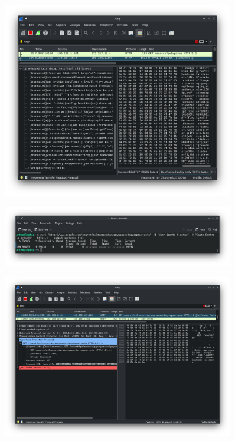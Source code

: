 \documentclass[12pt]{extarticle}
\begin{document}
\begin{figure}[H]
    \centering
    \includegraphics[width=0.90\textwidth]{shark_expires}
    \caption{}
\end{figure}
\begin{figure}[H]
    \centering
    \includegraphics[width=0.90\textwidth]{private}
    \caption{}
\end{figure}
\begin{figure}[H]
    \centering
    \includegraphics[width=0.90\textwidth]{shark_no_cashe}
    \caption{}
\end{figure}
\end{document}
